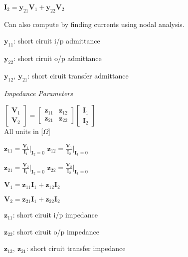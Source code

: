 \documentclass[twocolumn]{article}
\begin{document}
$\mathbf I_2 = \mathbf y_{21} \mathbf V_1 + \mathbf y_{22} \mathbf V_2$

Can also compute by finding currents using nodal analysis.

$\mathbf y_{11}$: short ciruit i/p admittance

$\mathbf y_{22}$: short ciruit o/p admittance

$\mathbf y_{12},\ \mathbf y_{21}$: short ciruit transfer admittance

\vspace{-.5em}
\dotfill

\textit{Impedance Parameters}

\begin{minipage}{0.39\columnwidth}
    $\begin{bmatrix}
        \mathbf V_1 \\ \mathbf V_2
    \end{bmatrix} =
    \begin{bmatrix}
        \mathbf z_{11} & \mathbf z_{12} \\
        \mathbf z_{21} & \mathbf z_{22}
    \end{bmatrix}
    \begin{bmatrix}
        \mathbf I_1 \\ \mathbf I_2
    \end{bmatrix}$ \\[1em]
    All units in [$\Omega$]
\end{minipage}
\hfill
\begin{minipage}{0.55\columnwidth}
    $\mathbf z_{11} = \frac{\mathbf V_1}{\mathbf I_1} \bigg|_{\mathbf I_2 = 0}$ \hfill $\mathbf z_{12} = \frac{\mathbf V_1}{\mathbf I_2} \bigg|_{\mathbf I_1 = 0}$

    $\mathbf z_{21} = \frac{\mathbf V_2}{\mathbf I_1} \bigg|_{\mathbf I_2 = 0}$ \hfill $\mathbf z_{22} = \frac{\mathbf V_2}{\mathbf I_2} \bigg|_{\mathbf I_1 = 0}$
\end{minipage}

$\mathbf V_1 = \mathbf z_{11} \mathbf I_1 + \mathbf z_{12} \mathbf I_2$

$\mathbf V_2 = \mathbf z_{21} \mathbf I_1 + \mathbf z_{22} \mathbf I_2$

$\mathbf z_{11}$: short ciruit i/p impedance

$\mathbf z_{22}$: short ciruit o/p impedance

$\mathbf z_{12},\ \mathbf z_{21}$: short ciruit transfer impedance


\newpage
\end{document}
